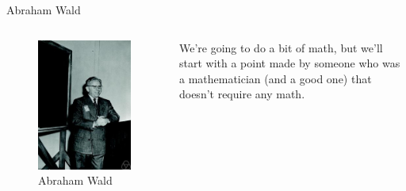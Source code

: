 \documentclass[
  ignorenonframetext,
]{beamer}
\renewcommand{\,}{\text{, }}
\begin{document}
\begin{frame}{Abraham Wald}
\protect\hypertarget{abraham-wald}{}
\begin{columns}[c]
\begin{column}{0.48\textwidth}
\begin{figure}
\centering
\includegraphics{../images/week10/wald_photo.jpg}
\caption{Abraham Wald}
\end{figure}
\end{column}

\begin{column}{0.48\textwidth}
We're going to do a bit of math, but we'll start with a point made by
someone who was a mathematician (and a good one) that doesn't require
any math.
\end{column}
\end{columns}
\end{frame}
\end{document}
